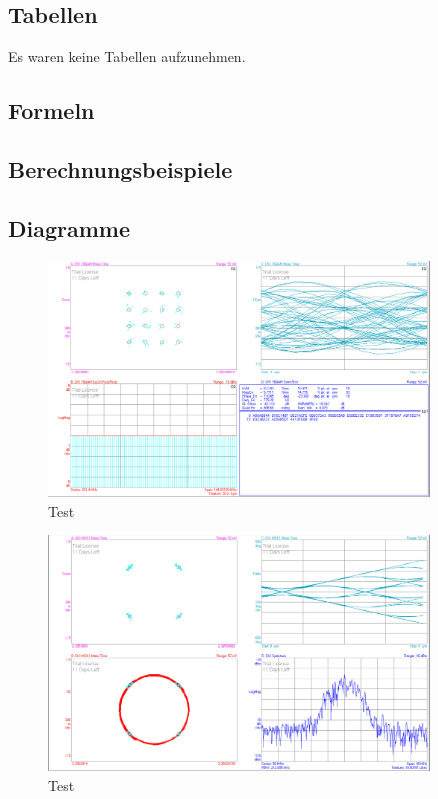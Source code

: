 \documentclass[12pt,a4paper,ngerman]{article}
\begin{document}
\subsection{Tabellen}
Es waren keine Tabellen aufzunehmen. 
\subsection{Formeln}

\subsection{Berechnungsbeispiele}


\pagebreak
\subsection{Diagramme}
\begin{figure}[H]
\centering
\includegraphics[width=0.9\textwidth]{figures/Aufgabe3_16QAM_demod.jpg} 
\caption{Test}
\end{figure}

\begin{figure}[H]
\centering
\includegraphics[width=0.9\textwidth]{figures/Aufgabe3_GMSK.jpg} 
\caption{Test}
\end{figure}
\end{document}
